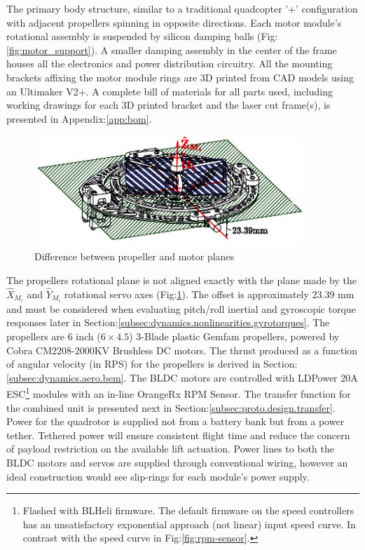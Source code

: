 \par
The primary body structure, similar to a traditional quadcopter '+' configuration with adjacent propellers spinning in opposite directions. Each motor module's rotational assembly is suspended by silicon damping balls (Fig:\ref{fig:motor_support}). A smaller damping assembly in the center of the frame houses all the electronics and power distribution circuitry. All the mounting brackets affixing the motor module rings are 3D printed from CAD models using an Ultimaker V2+\cite{ultimaker}. A complete bill of materials for all parts used, including working drawings for each 3D printed bracket and the laser cut frame(s), is presented in Appendix:\ref{app:bom}.
\par
\begin{figure}[hbtp]
\centering
\includegraphics[width=0.9\textwidth]{figs/motor-prop}
\caption{Difference between propeller and motor planes}
\label{fig:motor_prop}
\end{figure}
The propellers rotational plane is not aligned exactly with the plane made by the $\hat{X}_{M_i}$ and $\hat{Y}_{M_i}$ rotational servo axes (Fig:\ref{fig:motor_prop}). The offset is approximately 23.39 mm and must be considered when evaluating pitch/roll inertial and gyroscopic torque responses later in Section:\ref{subsec:dynamics.nonlinearities.gyrotorques}. The propellers are 6 inch ($6 \times 4.5$) 3-Blade plastic Gemfam propellers, powered by Cobra CM2208-2000KV Brushless DC motors. The thrust produced as a function of angular velocity (in RPS) for the propellers is derived in Section:\ref{subsec:dynamics.aero.bem}. 
\newpage
The BLDC motors are controlled with LDPower 20A ESC\footnote{Flashed with BLHeli\cite{BLHeli} firmware. The default firmware on the speed controllers has an unsatisfactory exponential approach (not linear) input speed curve. In contrast with the speed curve in Fig:\ref{fig:rpm-sensor}.} modules with an in-line OrangeRx RPM Sensor. The transfer function for the combined unit is presented next in Section:\ref{subsec:proto.design.transfer}. Power for the quadrotor is supplied not from a battery bank but from a power tether. Tethered power will ensure consistent flight time and reduce the concern of payload restriction on the available lift actuation. Power lines to both the BLDC motors and servos are supplied through conventional wiring, however an ideal construction would see slip-rings for each module's power supply. 
